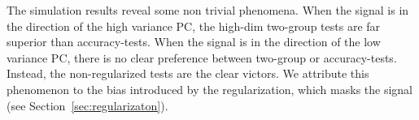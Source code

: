 \documentclass[oupdraft]{bio}
\begin{document}

    
The simulation results reveal some non trivial phenomena.
When the signal is in the direction of the high variance PC, the high-dim two-group tests are far superior than accuracy-tests. 
When the signal is in the direction of the low variance PC, there is no clear preference between two-group or accuracy-tests.
Instead, the non-regularized tests are the clear victors. 
We attribute this phenomenon to the bias introduced by the regularization, which masks the signal (see Section~\ref{sec:regularizaton}).
\end{document}
